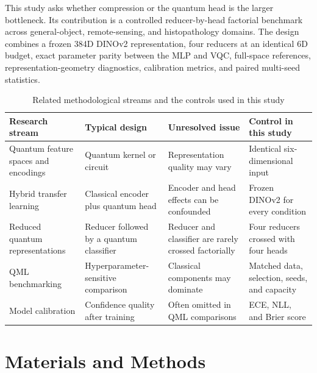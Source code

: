 \documentclass[pdflatex,sn-mathphys-ay]{sn-jnl}
\begin{document}
This study asks whether compression or the quantum head is the larger bottleneck. Its contribution is a controlled reducer-by-head factorial benchmark across general-object, remote-sensing, and histopathology domains. The design combines a frozen 384D DINOv2 representation, four reducers at an identical 6D budget, exact parameter parity between the MLP and VQC, full-space references, representation-geometry diagnostics, calibration metrics, and paired multi-seed statistics.


\begin{table}[htbp]
\centering
\caption{Related methodological streams and the controls used in this study}\label{tab:1}
\scriptsize
\setlength{\tabcolsep}{3.5pt}
\begin{tabularx}{\textwidth}{@{}>{\hsize=1.30\hsize\raggedright\arraybackslash}X>{\hsize=0.90\hsize\raggedright\arraybackslash}X>{\hsize=0.90\hsize\raggedright\arraybackslash}X>{\hsize=0.90\hsize\raggedright\arraybackslash}X@{}}
\toprule
\textbf{Research stream} & \textbf{Typical design} & \textbf{Unresolved issue} & \textbf{Control in this study} \\
\midrule
Quantum feature spaces and encodings \citep{SCHULD-KILLORAN-2019,SCHULD-SWEKE-MEYER-2021} & Quantum kernel or circuit & Representation quality may vary & Identical six-dimensional input \\
Hybrid transfer learning \citep{MARI-2020,MANGINI-2022} & Classical encoder plus quantum head & Encoder and head effects can be confounded & Frozen DINOv2 for every condition \\
Reduced quantum representations \citep{ODAGIU-2025} & Reducer followed by a quantum classifier & Reducer and classifier are rarely crossed factorially & Four reducers crossed with four heads \\
QML benchmarking \citep{EGGINGER-2024,SCHNABEL-ROTH-2025} & Hyperparameter-sensitive comparison & Classical components may dominate & Matched data, selection, seeds, and capacity \\
Model calibration \citep{GUO-2017,GNEITING-RAFTERY-2007} & Confidence quality after training & Often omitted in QML comparisons & ECE, NLL, and Brier score \\
\bottomrule
\end{tabularx}
\end{table}

\section{Materials and Methods}
\end{document}

